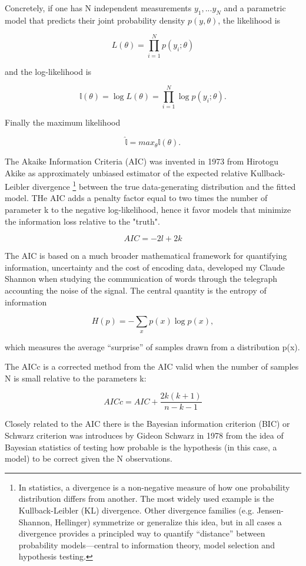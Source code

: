 Concretely, if one has N independent measurements {$y_1,...y_N$} and a parametric model that predicts their joint probability density $p(y,\theta)$, the likelihood is

$$
L(\theta)=\prod _{i=1} ^N p(y_i;\theta)
$$

and the log-likelihood is 

$$
\mathbb{l}(\theta)= \log L(\theta) =\prod _{i=1} ^N \log p(y_i;\theta).
$$

Finally the maximum likelihood

$$
\hat{\mathbb{l}} = max_{\theta} \mathbb{l}(\theta).
$$

The Akaike Information Criteria (AIC) was invented in 1973 from Hirotogu Akike as approximately unbiased estimator of the expected relative Kullback-Leibler divergence \footnote{In statistics, a divergence is a non-negative measure of how one probability distribution differs from another. The most widely used example is the Kullback-Leibler (KL) divergence. Other divergence families (e.g. Jensen-Shannon, Hellinger) symmetrize or generalize this idea, but in all cases a divergence provides a principled way to quantify “distance” between probability models—central to information theory, model selection and hypothesis testing.} between the true data-generating distribution and the fitted model. THe AIC adds a penalty factor equal to two times the number of parameter k to the negative log-likelihood, hence it favor models that minimize the information loss relative to the "truth".

$$
AIC = -2l +2k
$$

The AIC is based on a much broader mathematical framework for quantifying information, uncertainty and the cost of encoding data, developed my Claude Shannon when studying the communication of words through the telegraph accounting the noise of the signal. The central quantity is the entropy of information

$$
H(p) = -\sum _x p(x) \log p(x),
$$

which measures the average “surprise” of samples drawn from a distribution p(x).

The AICc is a corrected method from the AIC valid when the number of samples N is small relative to the parameters k:

$$
AICc = AIC + \frac{2k(k+1)}{n-k-1}
$$

Closely related to the AIC there is the Bayesian information criterion (BIC) or  Schwarz criterion was introduces by Gideon Schwarz in 1978 from the idea of Bayesian statistics of testing how probable is the hypothesis (in this case, a model) to be correct given the N observations. 

